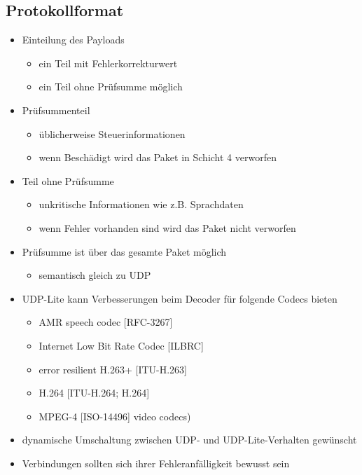 \documentclass{beamer}
\begin{document}
\subsection{Protokollformat}
\begin{frame}
\begin{itemize}
\item Einteilung des Payloads
	\begin{itemize}
	\item ein Teil mit Fehlerkorrekturwert
	\item ein Teil ohne Prüfsumme möglich
	\end{itemize}
\item Prüfsummenteil
	\begin{itemize}
	\item üblicherweise Steuerinformationen
	\item wenn Beschädigt wird das Paket in Schicht 4 verworfen
	\end{itemize}
\item Teil ohne Prüfsumme
	\begin{itemize}
	\item unkritische Informationen wie z.B. Sprachdaten
	\item wenn Fehler vorhanden sind wird das Paket nicht verworfen
	\end{itemize}
\item Prüfsumme ist über das gesamte Paket möglich
	\begin{itemize}
	\item semantisch gleich zu UDP
	\end{itemize}
\end{itemize}
\end{frame}


\begin{frame}
\begin{itemize}
\item UDP-Lite kann Verbesserungen beim Decoder für folgende Codecs bieten
	\begin{itemize}
	\item AMR speech codec [RFC-3267]
	\item Internet Low Bit Rate Codec [ILBRC]
	\item error resilient H.263+ [ITU-H.263]
	\item H.264 [ITU-H.264; H.264]
	\item MPEG-4 [ISO-14496] video codecs)
	\end{itemize}
\item dynamische Umschaltung zwischen UDP- und UDP-Lite-Verhalten gewünscht
\item Verbindungen sollten sich ihrer Fehleranfälligkeit bewusst sein
\end{itemize}
\end{frame}
\end{document}
